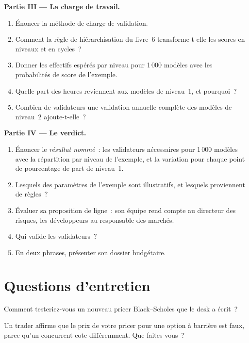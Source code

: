 \begin{problem}
\medskip\noindent\textbf{Partie III --- La charge de travail.}
\begin{enumerate}[resume]
\item Énoncer la méthode de charge de validation.
\item Comment la règle de hiérarchisation du livre~6 transforme-t-elle les scores en niveaux et en cycles~?
\item Donner les effectifs espérés par niveau pour 1\,000 modèles avec les probabilités de score de l'exemple.
\item Quelle part des heures reviennent aux modèles de niveau~1, et pourquoi~?
\item Combien de validateurs une validation annuelle complète des modèles de niveau~2 ajoute-t-elle~?
\end{enumerate}

\medskip\noindent\textbf{Partie IV --- Le verdict.}
\begin{enumerate}[resume]
\item Énoncer le \emph{résultat nommé}~: les validateurs nécessaires pour 1\,000 modèles avec la répartition par niveau de l'exemple, et la variation
pour chaque point de pourcentage de part de niveau~1.
\item Lesquels des paramètres de l'exemple sont illustratifs, et lesquels proviennent de règles~?
\item Évaluer sa proposition de ligne~: son équipe rend compte au directeur des risques, les développeurs au responsable des marchés.
\item Qui valide les validateurs~?
\item En deux phrases, présenter son dossier budgétaire.
\end{enumerate}
\end{problem}

\section{Questions d'entretien}

\begin{interviewq}\label{iq:in:bank-quant:1}
Comment testeriez-vous un nouveau pricer Black--Scholes que le desk a écrit~?
\end{interviewq}

\begin{interviewq}\label{iq:in:bank-quant:2}
Un trader affirme que le prix de votre pricer pour une option à barrière est faux, parce qu'un concurrent cote différemment. Que faites-vous~?
\end{interviewq}

